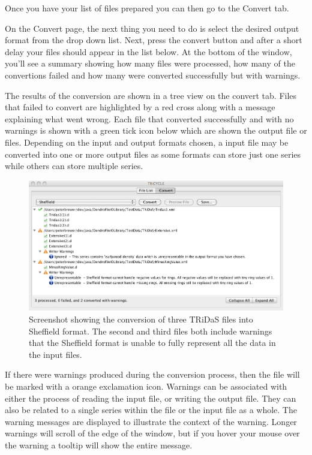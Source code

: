 \documentclass[10pt, headsepline,DIV14,BCOR0.5cm]{scrreprt}
\begin{document}
Once you have your list of files prepared you can then go to the Convert tab.


On the Convert page, the next thing you need to do is select the desired output format from the drop down
list. Next, press the convert button and after a short delay your files should appear in the list below. At the
bottom of the window, you'll see a summary showing how many files were processed, how many of the
convertions failed and how many were converted successfully but with warnings.


The results of the conversion are shown in a tree view on the convert tab. Files that failed to convert are
highlighted by a red cross along with a message explaining what went wrong. Each file that converted
successfully and with no warnings is shown with a green tick icon below which are shown the output file
or files. Depending on the input and output formats chosen, a input file may be converted into one or more
output files as some formats can store just one series while others can store multiple series.


\begin{figure}
\includegraphics[width=\textwidth]{screenshot1.png}
\caption{Screenshot showing the conversion of three TRiDaS files into Sheffield
format. The second and third files both include warnings that the Sheffield format
is unable to fully represent all the data in the input files.} 
\label{fig:screenshot}
\end{figure}

If there were warnings produced during the conversion process, then the file will be marked with a orange
exclamation icon. Warnings can be associated with either the process of reading the input file, or writing
the output file. They can also be related to a single series within the file or the input file as a whole. The
warning messages are displayed to illustrate the context of the warning. Longer warnings will scroll of the
edge of the window, but if you hover your mouse over the warning a tooltip will show the entire message.
\end{document}
